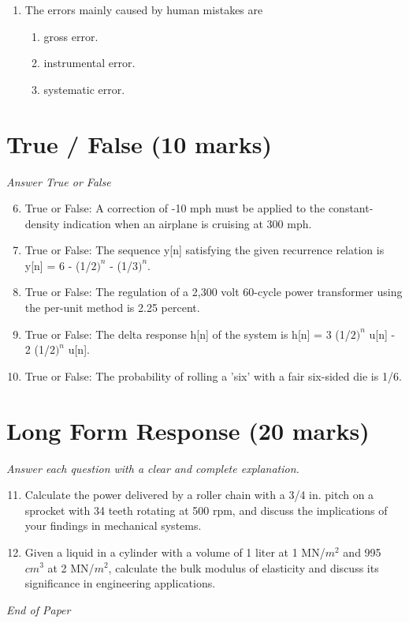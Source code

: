 \documentclass[12pt]{article}
\begin{document}
\begin{enumerate}[label=\arabic*.]
\begin{enumerate}[label=(\alph*)]
    \item y(x) = c\_1 * sin(x) + c\_2 * cos(x)
    \item y(x) = c\_1 * y\_1($x)^2$ + c\_2 * y\_2($x)^2$
    \item y(x) = c\_1 y\_1(x) + c\_2 y\_2(x)
    \item y(x) = c\_1 * x * y\_1(x) + c\_2 / (x * y\_2(x))
    \item y(x) = c\_1 * y\_1(x) / (c\_2 * y\_2(x))
\end{enumerate}
\item The errors mainly caused by human mistakes are
\begin{enumerate}[label=(\alph*)]
    \item gross error.
    \item instrumental error.
    \item systematic error.
\end{enumerate}
\end{enumerate}

\section*{True / False (10 marks)}
\textit{Answer True or False}
\begin{enumerate}[label=\arabic*.]
\setcounter{enumi}{5}
\item True or False: A correction of -10 mph must be applied to the constant-density indication when an airplane is cruising at 300 mph.
\item True or False: The sequence y[n] satisfying the given recurrence relation is y[n] = 6 - (1/$2)^n$ - (1/$3)^n$.
\item True or False: The regulation of a 2,300 volt 60-cycle power transformer using the per-unit method is 2.25 percent.
\item True or False: The delta response h[n] of the system is h[n] = 3 (1/$2)^n$ u[n] - 2 (1/$2)^n$ u[n].
\item True or False: The probability of rolling a 'six' with a fair six-sided die is 1/6.
\end{enumerate}

\section*{Long Form Response (20 marks)}
\textit{Answer each question with a clear and complete explanation.}
\begin{enumerate}[label=\arabic*.]
\setcounter{enumi}{10}
\item Calculate the power delivered by a roller chain with a 3/4 in. pitch on a sprocket with 34 teeth rotating at 500 rpm, and discuss the implications of your findings in mechanical systems.
\item Given a liquid in a cylinder with a volume of 1 liter at 1 MN/$m^2$ and 995 $cm^3$ at 2 MN/$m^2$, calculate the bulk modulus of elasticity and discuss its significance in engineering applications.
\end{enumerate}

\vfill
\noindent\textit{End of Paper}
\end{document}
